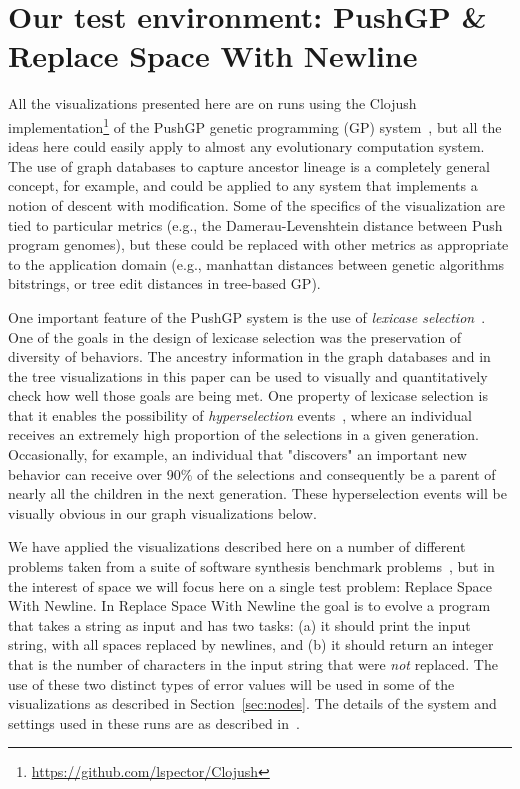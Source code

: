 \documentclass{sig-alternate}
\begin{document}
\section{Our test environment: PushGP \& Replace Space With Newline}
\label{sec:testEnv}

All the visualizations presented here are on runs using the Clojush
implementation\footnote{\url{https://github.com/lspector/Clojush}} of the 
PushGP genetic programming (GP) system~\cite{spector:2002:GPEM, 1068292}, 
but all the ideas here
could easily apply to almost any evolutionary computation system. The use
of graph databases to capture ancestor lineage is a completely general
concept, for example, and could be applied to any system that implements a
notion of descent with modification. Some of the specifics of the visualization
are tied to particular metrics (e.g., the Damerau-Levenshtein distance
between Push program genomes), but these could be replaced with other
metrics as appropriate to the application domain (e.g., manhattan distances
between genetic algorithms bitstrings, or tree edit distances in
tree-based GP).

One important feature of the PushGP system is the use of \emph{lexicase
selection}~\cite{Helmuth:2015:ieeeTEC}. One of the goals in the design of
lexicase selection was the preservation of diversity of behaviors. The
ancestry information in the graph databases and in the tree visualizations 
in this paper can be used to visually and quantitatively check how
well those goals are being met. One property of lexicase selection is
that it enables the possibility of \emph{hyperselection} events~\cite{Helmuth:2016:GECCO},
where an individual receives an extremely high proportion of the selections
in a given generation. Occasionally, for example, an individual that
"discovers" an important new behavior can receive over 90\% of the selections
and consequently be a parent of nearly all the children in the next generation.
These hyperselection events will be visually obvious in our graph visualizations
below.

We have applied the visualizations described here on a 
number of different problems taken from a suite of software synthesis benchmark 
problems~\cite{Helmuth:2015:GECCO}, but in the interest of space we
will focus here on a single test problem: Replace Space With Newline.
In Replace Space With Newline the goal is to evolve a program that takes a string
as input and has two tasks: (a) it should print the input string, with all spaces
replaced by newlines, and (b) it should return an integer that is the number of
characters in the input string that were \emph{not} replaced. The use of
these two distinct types of error values will be used in some of the visualizations
as described in Section~\ref{sec:nodes}. The details of the system and
settings used in these runs are as described in~\cite{Helmuth:2015:GECCO}.
\end{document}
